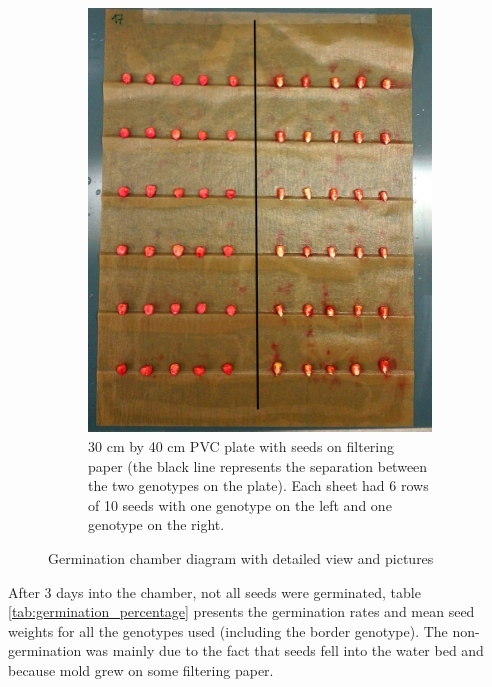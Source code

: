 \begin{figure}[!htb]
\begin{subfigure}[b]{0.475\textwidth}
            \label{fig:germiantion_ledge}
        \end{subfigure}
        \quad
        \begin{subfigure}[b]{0.475\textwidth}   
            \centering 
            \includegraphics[width=\textwidth]{figures/photo_germination_plate.jpg}
            \caption[]%
            {30 cm by 40 cm PVC plate with seeds on filtering paper (the black line represents the separation between the two genotypes on the plate). Each sheet had 6 rows of 10 seeds with one genotype on the left and one genotype on the right.}    
            \label{fig:photo_germination_plate}
        \end{subfigure}
        \caption{Germination chamber diagram with detailed view and pictures}
    \end{figure}

After 3 days into the chamber, not all seeds were germinated, table \ref{tab:germination_percentage} presents the germination rates and mean seed weights for all the genotypes used (including the border genotype). The non-germination was mainly due to the fact that seeds fell into the water bed and because mold grew on some filtering paper.


